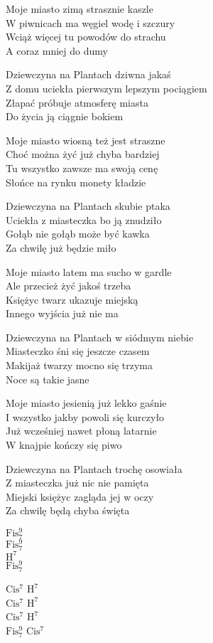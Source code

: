 \begin{text}
    Moje miasto zimą strasznie kaszle\\
    W piwnicach ma węgiel wodę i szczury\\
    Wciąż więcej tu powodów do strachu\\
    A coraz mniej do dumy

    Dziewczyna na Plantach dziwna jakaś\\
    Z domu uciekła pierwszym lepszym pociągiem\\
    Złapać próbuje atmosferę miasta\\
    Do życia ją ciągnie bokiem

    Moje miasto wiosną też jest straszne\\
    Choć można żyć już chyba bardziej\\
    Tu wszystko zawsze ma swoją cenę\\
    Słońce na rynku monety kładzie

    Dziewczyna na Plantach skubie ptaka\\
    Uciekła z miasteczka bo ją znudziło\\
    Gołąb nie gołąb może być kawka\\
    Za chwilę już będzie miło

    Moje miasto latem ma sucho w gardle\\
    Ale przecież żyć jakoś trzeba\\
    Księżyc twarz ukazuje miejską\\
    Innego wyjścia już nie ma

    Dziewczyna na Plantach w siódmym niebie\\
    Miasteczko śni się jeszcze czasem\\
    Makijaż twarzy mocno się trzyma\\
    Noce są takie jasne

    Moje miasto jesienią już lekko gaśnie\\
    I wszystko jakby powoli się kurczyło\\
    Już wcześniej nawet płoną latarnie\\
    W knajpie kończy się piwo

    Dziewczyna na Plantach trochę osowiała\\
    Z miasteczka już nic nie pamięta\\
    Miejski księżyc zagląda jej w oczy\\
    Za chwilę będą chyba święta
\end{text}
\begin{chord}
    $\mathrm{Fis_{7}^{9}}$\\
    $\mathrm{Fis_{7}^{9}}$\\
    $\mathrm{H^{7}}$\\
    $\mathrm{Fis_{7}^{9}}$

    $\mathrm{Cis^{7}}$ $\mathrm{H^{7}}$\\
    $\mathrm{Cis^{7}}$ $\mathrm{H^{7}}$\\
    $\mathrm{Cis^{7}}$ $\mathrm{H^{7}}$\\
    $\mathrm{Fis_{7}^{9}}$ $\mathrm{Cis^{7}}$
\end{chord}

